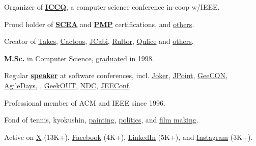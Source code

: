 \documentclass{vl}
\begin{document}
    Organizer of \href{https://www.iccq.ru}{\textbf{ICCQ}}, a computer science conference in-coop w/IEEE.

    Proud holder of \textbf{\href{https://github.com/yegor256/blog/blob/master/pdf/certifications/OCMJEA-Feb11.pdf}{SCEA}} and
    \textbf{\href{https://github.com/yegor256/blog/blob/master/pdf/certifications/PMP-Jun07.pdf}{PMP}} certifications,
    and \href{https://github.com/yegor256/blog/tree/master/pdf/certifications}{others}.

    Creator of \href{https://www.takes.org}{Takes},
    \href{https://www.cactoos.org}{Cactoos},
    \href{https://www.jcabi.com}{JCabi},
    \href{https://www.rultor.com}{Rultor},
    \href{https://www.qulice.com}{Qulice} and
    \href{https://www.yegor256.com/pets.html}{others}.

    \textbf{M.Sc.} in Computer Science,
    \href{https://en.wikipedia.org/wiki/Oles_Honchar_Dnipro_National_University}{graduated} in 1998.

    Regular \textbf{\href{https://www.yegor256.com/talks.html}{speaker}}
    at software conferences, incl.
    \href{https://youtu.be/55mwAbuDrV8}{Joker},
    \href{https://www.youtube.com/watch?v=20QBvrHq6TA}{JPoint},
    \href{https://vimeo.com/177215750}{GeeCON},
    \href{https://www.youtube.com/watch?v=TLM9eN0b6zo}{AgileDays},
    \href{https://www.youtube.com/watch?v=03PXmPc7Q3g}{},
    \href{https://www.youtube.com/watch?v=7yTIWFZrXpg}{GeekOUT},
    \href{https://www.youtube.com/watch?v=vU_x6oK437I}{NDC},
    \href{https://www.youtube.com/watch?v=GS45LzE3LPQ}{JEEConf}.

    Professional member of ACM and IEEE since 1996.

    Fond of
    tennis,
    kyokushin,
    \href{https://www.yegor256.com/paintings.html}{painting},
    \href{https://ru.yegor256.com}{politics},
    and
    \href{https://www.imdb.com/name/nm15660607}{film making}.

    Active on
    \href{https://twitter.com/intent/follow?screen_name=yegor256}{X} (13K+),
    \href{https://www.facebook.com/yegor256}{Facebook} (4K+),
    \href{https://www.linkedin.com/in/yegor256}{LinkedIn} (5K+),
    and
    \href{https://instagram.com/yegor256}{Instagram} (3K+).
\end{document}
